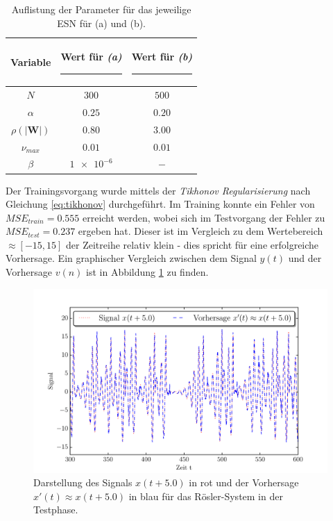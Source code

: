 \begin{table}[H]
	\centering
	\captionsetup{width=0.9\linewidth}
		\begin{tabular}{|c|c|c|}
		\rule[-1ex]{0pt}{3.5ex} Variable & \hspace{4ex} Wert für \textit{(a)} \rule[-1ex]{4ex}{0pt} & \hspace{4ex} Wert für \textit{(b)} \rule[-1ex]{4ex}{0pt}\\ 
		\hline \hline 
		\rule[-1ex]{0pt}{3.5ex} $N$ & $300$ & $500$ \\ 
		\hline 
		\rule[-1ex]{0pt}{3.5ex} $\alpha$ & $0.25$ & $0.20$ \\ 
		\hline 
		\rule[-1ex]{0pt}{3.5ex} $\rho(|\mathbf{W}|)$ & $0.80$ & $3.00$\\ 
		\hline 
		\rule[-1ex]{0pt}{3.5ex} $\nu_{max}$ & $0.01$ & $0.01$\\ 
		\hline 
		\rule[-1ex]{0pt}{3.5ex} $\beta$ & $\num{1e-6}$ & $-$\\ 
		\hline 
	\end{tabular} 
	\caption{Auflistung der Parameter für das jeweilige \textsc{ESN} für (a) und (b).}
	\label{tab:application_roessler}
\end{table}

Der Trainingsvorgang wurde mittels der \textit{Tikhonov Regularisierung} nach Gleichung \ref{eq:tikhonov} durchgeführt. Im Training konnte ein Fehler von $MSE_{train} = 0.555 	$ erreicht werden, wobei sich im Testvorgang der Fehler zu $MSE_{test} = 0.237$ ergeben hat. Dieser ist im Vergleich zu dem Wertebereich $\approx[-15,15]$ der Zeitreihe relativ klein - dies spricht für eine erfolgreiche Vorhersage. Ein graphischer Vergleich zwischen dem Signal $y(t)$ und der Vorhersage $v(n)$ ist in Abbildung \ref{fig:application_roessler_a} zu finden.

\vspace{-3.25ex}
\begin{figure}[H]
    \centering
    \includegraphics[width = 0.9 \textwidth]{figures/roessler_pred50.pdf}
    \caption{Darstellung des Signals $x(t+5.0)$ in rot und der Vorhersage $x'(t) \approx x(t+5.0)$ in blau für das Rösler-System in der Testphase.}
    \label{fig:application_roessler_a}
\end{figure}

